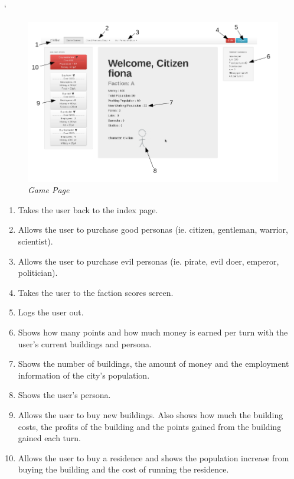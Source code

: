 `\documentclass{sig-alt-release2}
\begin{document}
\begin{figure}[!htbp]
  \caption{\textit{Game Page}}
  \begin{center}
		\includegraphics[scale=0.30]{img/gamelabel.png}
  \end{center}
\end{figure}

\begin{enumerate}
\item Takes the user back to the index page.
\item Allows the user to purchase good personas (ie. citizen, gentleman, warrior, scientist).
\item Allows the user to purchase evil personas (ie. pirate, evil doer, emperor, politician).
\item Takes the user to the faction scores screen.
\item Logs the user out.
\item Shows how many points and how much money is earned per turn with the user's current buildings and persona.
\item Shows the number of buildings, the amount of money and the employment information of the city's population.
\item Shows the user's persona.
\item Allows the user to buy new buildings. Also shows how much the building costs, the profits of the building and the points gained from the building gained each turn.
\item Allows the user to buy a residence and shows the population increase from buying the building and the cost of running the residence.
\end{enumerate}
\end{document}
